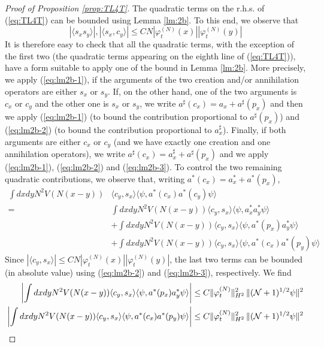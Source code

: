 \documentclass[11pt,a4paper,DIV11]{scrartcl}	%
\newcommand{\cN}{{\cal N}}
\begin{document}
\begin{proof}[Proof of Proposition \ref{prop:TL4T}]
The quadratic terms on the r.h.s. of (\ref{eq:TL4T}) can be bounded using Lemma \ref{lm:2b}. To this end, we observe that
\[ |\langle s_x s_y \rangle| , |\langle s_x, c_y \rangle| \leq C N |\varphi^{(N)}_t (x)| |\varphi_t^{(N)} (y)| \]
It is therefore easy to check that all the quadratic terms, with the exception of the first two (the quadratic terms appearing on the eighth line of (\ref{eq:TL4T})), have a form suitable to apply one of the bound in Lemma \ref{lm:2b}. More precisely, we apply (\ref{eq:lm2b-1}), if the arguments of the two creation and/or annihilation operators are either $s_x$ or $s_y$. If, on the other hand, one of the two arguments is $c_x$ or $c_y$ and the other one is $s_x$ or $s_y$, we write $a^\sharp (c_x) = a_x + a^\sharp (p_x)$ and then we apply (\ref{eq:lm2b-1}) (to bound the contribution proportional to $a^\sharp (p_x)$) and (\ref{eq:lm2b-2}) (to bound the contribution proportional to $a_x^\sharp$). Finally, if both arguments are either $c_x$ or $c_y$ (and we have  exactly one creation and one annihilation operators), we write $a^\sharp (c_x) = a^\sharp_x + a^\sharp (p_x)$ and we apply (\ref{eq:lm2b-1}), (\ref{eq:lm2b-2}) and (\ref{eq:lm2b-3}). To control the two remaining quadratic contributions, we observe that, writing $a^* (c_x)= a^*_x + a^* (p_x)$,  
\begin{equation} \begin{split}\label{eq:4-2}  \int dx dy N^2 V(N (x-y)) & \langle c_y , s_x \rangle \langle \psi , a^* (c_x) a^* (c_y) \psi \rangle \\ =\; & \int dx dy N^2 V(N (x-y)) \langle c_y , s_x \rangle \langle \psi , a^*_x a^*_y \psi \rangle
\\ &+  \int dx dy N^2 V(N (x-y)) \langle c_y , s_x \rangle \langle \psi , a^* (p_x) a^*_y \psi\rangle
\\ &+  \int dx dy N^2 V(N (x-y)) \langle c_y , s_x \rangle \langle \psi , a^* (c_x) a^*(p_y) \psi \rangle \end{split} \end{equation}
Since $|\langle c_y , s_x \rangle| \leq C N |\varphi^{(N)}_t (x)| |\varphi^{(N)}_t (y)|$, the last two terms can be bounded (in absolute value) using (\ref{eq:lm2b-2}) and (\ref{eq:lm2b-3}), respectively. We find
\[ \begin{split}
\left|   \int dx dy N^2 V(N (x-y)) \langle c_y , s_x \rangle \langle \psi , a^* (p_x) a^*_y \psi\rangle \right| &\leq C \| \varphi_t^{(N)} \|_{H^2}^2 \,  \| (\cN+1)^{1/2} \psi \|^2 \\ 
\left|   \int dx dy N^2 V(N (x-y)) \langle c_y , s_x \rangle \langle \psi , a^* (c_x) a^* (p_y) \psi\rangle \right| &\leq C  \| \varphi_t^{(N)} \|_{H^2}^2 \, \| (\cN+1)^{1/2} \psi \|^2 

\end{split}\]
\end{proof}
\end{document}
